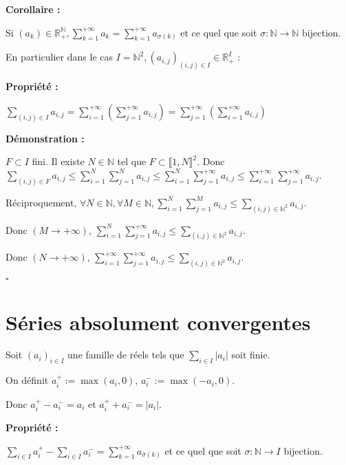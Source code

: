 \documentclass[10pt,a4paper,notitlepage ]{article}
\newenvironment{propriete}{
	\begin{tcolorbox}
		\textbf{Propriété : }
}
{\end{tcolorbox}}
\newenvironment{demo}{

	\textbf{Démonstration :}
}{\begin{flushright}
	$\square$
\end{flushright}
}
\newenvironment{corollaire}{
	\begin{tcolorbox}
		\textbf{Corollaire : }
	}
	{\end{tcolorbox}}
\begin{document}
\begin{corollaire}
	Si $(a_k) \in \mathbb R_+^{\mathbb N}, \sum_{k=1}^{+\infty}a_k=\sum_{k=1}^{+\infty}a_{\sigma(k)}$ et ce quel que soit $\sigma : \mathbb N \rightarrow \mathbb N$ bijection.
\end{corollaire}

En particulier dans le cas $I=\mathbb N^2, (a_{i,j})_{(i,j)\in I}\in \mathbb R_+^I$ :
\begin{propriete}
	$\sum_{(i,j)\in I}a_{i,j} = \sum_{i=1}^{+\infty}\left(\sum_{j=1}^{+\infty}a_{i,j}\right) =
	\sum_{j=1}^{+\infty}\left(\sum_{i=1}^{+\infty}a_{i,j}\right)$
\end{propriete}

\begin{demo}
	$F\subset I$ fini. Il existe $N \in \mathbb N$ tel que $F \subset \llbracket 1,N\rrbracket^2$. Donc $\sum_{(i,j)\in F}a_{i,j} \le \sum_{i=1}^{N}\sum_{j=1}^{N}a_{i,j} \le
	\sum_{i=1}^N\sum_{j=1}^{+\infty}a_{i,j} \le
	\sum_{i=1}^{+\infty}\sum_{j=1}^{+\infty}a_{i,j}$.
	
	Réciproquement, $\forall N\in\mathbb N, \forall M \in\mathbb N, \sum_{i=1}^N\sum_{j=1}^Ma_{i,j} \le
	\sum_{(i,j)\in \mathbb N^2}a_{i,j}$.
	
	Donc $(M\rightarrow +\infty)$, $\sum_{i=1}^N\sum_{j=1}^{+\infty}a_{i,j} \le
	\sum_{(i,j)\in \mathbb N^2}a_{i,j}$.
	
	Donc $(N\rightarrow +\infty)$, $\sum_{i=1}^{+\infty}\sum_{j=1}^{+\infty}a_{i,j} \le
	\sum_{(i,j)\in \mathbb N^2}a_{i,j}$.
\end{demo}

\part*{Séries absolument convergentes}

Soit $(a_i)_{i\in I}$ une famille de réels tels que $\sum_{i\in I}|a_i|$ soit finie.

On définit $a_i^+ := \max(a_i,0)$, $a_i^- := \max(-a_i, 0)$.

Donc $a_i^+ - a_i^- = a_i$ et $a_i^+ + a_i^- = |a_i|$.

\begin{propriete}
	$\sum_{i\in I}a_i^+ - \sum_{i\in I}a_i^- = \sum_{k=1}^{+\infty}a_{\sigma(k)}$ et ce quel que soit $\sigma : \mathbb N \rightarrow I$ bijection.
\end{propriete}
\end{document}
